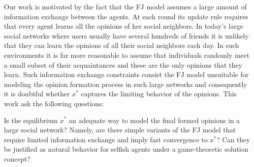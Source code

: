 Our work is motivated by the fact that the FJ model assumes a large amount of
information exchange between the agents. At each round its update rule requires
that every agent learns all the opinions of her social neighbors.  In today's
large social networks where users usually have several hundreds of friends it
is unlikely that they can learn the opinions of all their social neighbors each
day.
In such environments it is far more reasonable to assume that individuals randomly
meet a small subset of their acquaintances and these are the only opinions that
they learn.  Such information exchange constraints consist the FJ model
unsuitable for modeling the opinion formation process in such large networks
and consequently it is doubtful whether $x^*$ captures the limiting behavior 
of the opinions. This work ask the following questions:
\begin{question}\label{q:motivation1}
Is the equilibrium $x^*$ an adequate way to model
the final formed opinions in a large social network? Namely, are there 
simple variants of the FJ model that require limited information exchange and
imply fast convergence to $x^*$? Can they be justified as natural behavior
for selfish agents under a game-theoretic solution concept?
\end{question}

